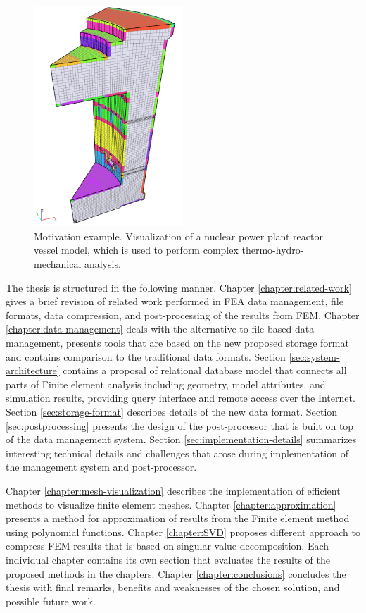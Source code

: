 \begin{figure}[H]
\centering
\includegraphics[width=0.5\textwidth]{figures/chapter-introduction/motivation-example}
\decoRule
\caption[Motivation example -- reactor vessel model visualization.]{Motivation example. Visualization of a nuclear power plant reactor vessel model, which is used to perform complex thermo-hydro-mechanical analysis.}
\label{fig:motivation-example}
\end{figure}

The thesis is structured in the following manner. Chapter \ref{chapter:related-work} gives a brief revision of related work performed in FEA data management, file formats, data compression, and post-processing of the results from FEM. Chapter \ref{chapter:data-management} deals with the alternative to file-based data management, presents tools that are based on the new proposed storage format and contains comparison to the traditional data formats. Section \ref{sec:system-architecture} contains a proposal of relational database model that connects all parts of Finite element analysis including geometry, model attributes, and simulation results, providing query interface and remote access over the Internet. Section \ref{sec:storage-format} describes details of the new data format. Section \ref{sec:postprocessing} presents the design of the post-processor that is built on top of the data management system. Section \ref{sec:implementation-details} summarizes interesting technical details and challenges that arose during implementation of the management system and post-processor.

Chapter \ref{chapter:mesh-visualization} describes the implementation of efficient methods to visualize finite element meshes. Chapter \ref{chapter:approximation} presents a method for approximation of results from the Finite element method using polynomial functions. Chapter \ref{chapter:SVD} proposes different approach to compress FEM results that is based on singular value decomposition. Each individual chapter contains its own section that evaluates the results of the proposed methods in the chapters. Chapter \ref{chapter:conclusions} concludes the thesis with final remarks, benefits and weaknesses of the chosen solution, and possible future work.

